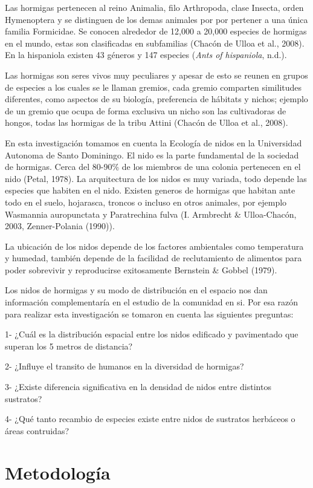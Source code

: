 \documentclass[11pt,]{article}
\begin{document}
Las hormigas pertenecen al reino Animalia, filo Arthropoda, clase
Insecta, orden Hymenoptera y se distinguen de los demas animales por por
pertener a una única familia Formicidae. Se conocen alrededor de 12,000
a 20,000 especies de hormigas en el mundo, estas son clasificadas en
subfamilias (Chacón de Ulloa et al., 2008). En la hispaniola existen 43
géneros y 147 especies (\emph{Ants of hispaniola}, n.d.).

Las hormigas son seres vivos muy peculiares y apesar de esto se reunen
en grupos de especies a los cuales se le llaman gremios, cada gremio
comparten similitudes diferentes, como aspectos de su biología,
preferencia de hábitats y nichos; ejemplo de un gremio que ocupa de
forma exclusiva un nicho son las cultivadoras de hongos, todas las
hormigas de la tribu Attini (Chacón de Ulloa et al., 2008).

En esta investigación tomamos en cuenta la Ecología de nidos en la
Universidad Autonoma de Santo Dominingo. El nido es la parte fundamental
de la sociedad de hormigas. Cerca del 80-90\% de los miembros de una
colonia pertenecen en el nido (Petal, 1978). La arquitectura de los
nidos es muy variada, todo depende las especies que habiten en el nido.
Existen generos de hormigas que habitan ante todo en el suelo,
hojarasca, troncos o incluso en otros animales, por ejemplo Wasmannia
auropunctata y Paratrechina fulva (I. Armbrecht \& Ulloa-Chacón, 2003,
Zenner-Polania (1990)).

La ubicación de los nidos depende de los factores ambientales como
temperatura y humedad, también depende de la facilidad de reclutamiento
de alimentos para poder sobrevivir y reproducirse exitosamente Bernstein
\& Gobbel (1979).

Los nidos de hormigas y su modo de distribución en el espacio nos dan
información complementaría en el estudio de la comunidad en si. Por esa
razón para realizar esta investigación se tomaron en cuenta las
siguientes preguntas:

1- ¿Cuál es la distribución espacial entre los nidos edificado y
pavimentado que superan los 5 metros de distancia?

2- ¿Influye el transito de humanos en la diversidad de hormigas?

3- ¿Existe diferencia significativa en la densidad de nidos entre
distintos sustratos?

4- ¿Qué tanto recambio de especies existe entre nidos de sustratos
herbáceos o áreas contruidas?

\section{Metodología}\label{metodologuxeda}
\end{document}
